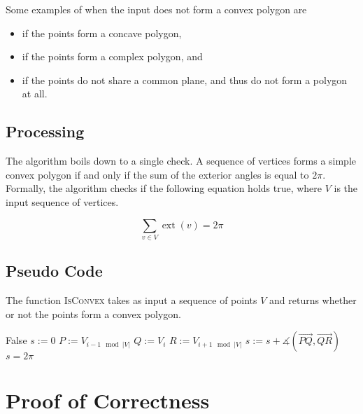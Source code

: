 \documentclass{article}
\newcommand{\vecl}{\overrightarrow} %
\newcommand{\ang}[1]{\measuredangle\left( #1 \right)}
\newcommand{\exta}[1]{\operatorname{ext}\left( #1 \right)} %
\begin{document}
Some examples of when the input does not form a convex polygon are
\begin{itemize}
	\item if the points form a concave polygon,
	\item if the points form a complex polygon, and
	\item if the points do not share a common plane, and thus do not form a polygon at all.
\end{itemize}

\subsection{Processing}

The algorithm boils down to a single check. A sequence of vertices forms a simple convex polygon if and only if the sum of the exterior angles is equal to \(2\pi\). Formally, the algorithm checks if the following equation holds true, where \(V\) is the input sequence of vertices.

\begin{equation*}
	\sum_{v \in V} \exta{v} = 2\pi
\end{equation*}

\subsection{Pseudo Code}

The function \textsc{IsConvex} takes as input a sequence of points \(V\) and returns whether or not the points form a convex polygon.

\begin{algorithm}[htbp]
	\begin{algorithmic}
		\Return False
		\EndIf
		\State \(s := 0\) 
		\State \(P := V_{i-1 \mod |V|}\) 
		\State \(Q := V_{i}\) 
		\State \(R := V_{i+1 \mod |V|}\) 
		\State \(s := s + \ang{\vecl{PQ}, \vecl{QR}}\) 
		\EndFor
		\State\Return \(s = 2\pi\)
		\EndFunction
	\end{algorithmic}
\end{algorithm}

\section{Proof of Correctness}
\end{document}

